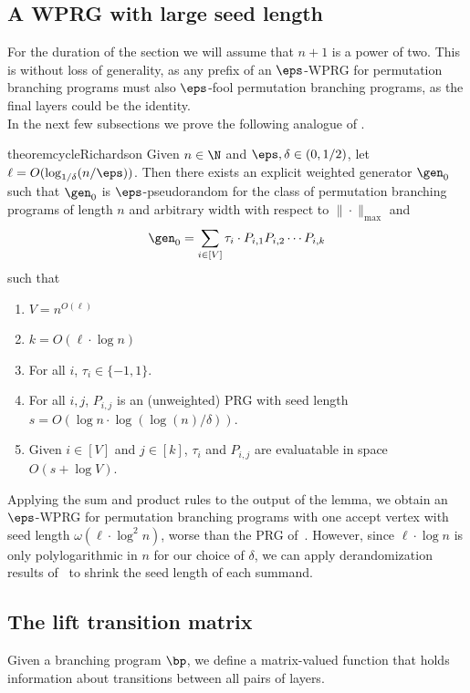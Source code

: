 \documentclass{toc}
\begin{document}
\subsection{A WPRG with large seed length}
For the duration of the section we will assume that $n+1$ is a power of two. This is without loss of generality, as any prefix of an $\eps$-WPRG for permutation branching programs must also $\eps$-fool permutation branching programs, as the final layers could be the identity.\\ 

In the next few subsections we prove the following analogue of 
. %
\begin{restatable}{theorem}{cycleRichardson}
\label{thm:cycleRichardson}
Given $n \in \N$ and $\eps,\delta \in (0,1/2)$, let $\ell=O( \log_{1/\delta}(n/\eps))$. 
Then there exists an explicit weighted generator $\gen_0$ such that $\gen_0$ is $\eps$-pseudorandom for the class of permutation branching programs of length $n$ and arbitrary width with respect to $\|\cdot\|_{\max}$ and 
\[\gen_0 = \sum_{i\in [V]}\tau_i\cdot P_{i,1}P_{i,2}\cdots P_{i,k}\]
such that %
\begin{enumerate}
    \item $V=n^{O(\ell)}$
    \item $k=O(\ell\cdot \log n)$
    \item For all $i$, $\tau_i\in \{-1,1\}$.
    \item For all $i,j$, $P_{i,j}$ is an (unweighted) PRG with seed length $s=O(\log n \cdot\log(\log(n)/\delta))$.
    \item Given $i\in [V]$ and $j\in [k]$, $\tau_i$ and $P_{i,j}$ are evaluatable in space $O(s+\log V)$.
\end{enumerate}
\end{restatable}

Applying the sum and product rules to the output of the lemma, we obtain an $\eps$-WPRG for permutation branching programs with one accept vertex with seed length $\omega(\ell\cdot \log^2 n)$, worse than the PRG of~\cite{HozaPyVa21}. However, since $\ell\cdot \log n$ is only polylogarithmic in $n$ for our choice of $\delta$, we can apply derandomization results of~\cite{HozaPyVa21} to shrink the seed length of each summand. 

\subsection{The lift transition matrix}
Given a branching program $\bp$, we define a %
matrix-valued %
function that holds information about transitions between all pairs of layers.
\end{document}
